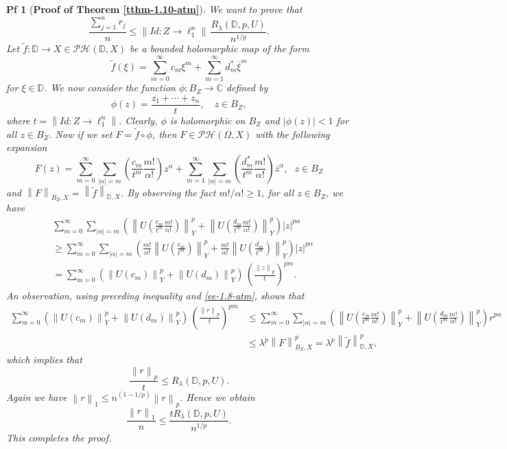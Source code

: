 \documentclass[10pt,a4paper]{amsart}
\newtheorem{pf}{Pf}
\newcommand{\norm}[1]{\left\lVert#1\right\rVert}
\begin{document}
\begin{pf} [{\bf Proof of Theorem \ref{tthm-1.10-atm}}]
	We want to prove that 
	\begin{equation*}
		\frac{\sum_{j=1}^{n}r_j}{n}\leq \norm{Id: Z \rightarrow \ell^n_{1}}\, \frac{R_\lambda(\mathbb{D},p,U)}{n^{1/p}}.
	\end{equation*}
	Let $\tilde{f}:\mathbb{D}\rightarrow X \in \mathcal{PH}(\mathbb{D},X)$ be a bounded holomorphic map of the form $$\tilde{f}(\xi)=\sum_{m=0}^{\infty} c_{m} \xi^m + \sum_{m=1}^{\infty} d^{*}_m \overline{\xi}^m
	$$
	 for $\xi \in \mathbb{D}$. We now consider the function $\phi: B_{Z}\rightarrow \mathbb{C}$ defined by 
	\begin{equation} \label{e-function}
		\phi(z)=\frac{z_1+\cdots+z_n}{t},\quad z\in B_{Z},
	\end{equation}
	where $t= \norm{Id: Z \rightarrow \ell^n_{1}}$. Clearly, $\phi$ is holomorphic on $B_{Z}$ and $|\phi(z)|<1$ for all $z \in B_{Z}$.
	Now if we set $F=\tilde{f} \circ \phi $, then $F \in \mathcal{PH}(\Omega,X)$ with the following expansion 
	\begin{equation*}
		F(z)=\sum_{m=0}^{\infty} \sum_{|\alpha|=m} \left(\frac{c_{m}}{t^m} \frac{m!}{\alpha!}\right) z^{\alpha} +  \sum_{m=1}^{\infty} \sum_{|\alpha|=m} \left(\frac{d^{*}_{m}}{t^m} \frac{m!}{\alpha!}\right) \overline{z}^{\alpha},\,\, \,\, z \in B_{Z}
	\end{equation*}
	and $\norm{F}_{B_{Z},X}=\norm{\tilde{f}}_{\mathbb{D},X}$.
	By observing the fact $m!/\alpha! \geq 1$, for all $z\in B_{Z}$, we have
	\begin{align*}
		&\sum_{m=0}^{\infty} \sum_{|\alpha|=m} \left(\norm{U\left(\frac{c_{m}}{t^m} \frac{m!}{\alpha!}\right)}^p_{Y} + \norm{U\left(\frac{d_{m}}{t^m} \frac{m!}{\alpha!}\right)}^p_{Y}\right)|z|^{p \alpha} \nonumber \\
		& \geq \sum_{m=0}^{\infty} \sum_{|\alpha|=m} \left(\frac{m!}{\alpha!}\norm{U\left(\frac{c_{m}}{t^m} \right)}^p_{Y} + \frac{m!}{\alpha!}\norm{U\left(\frac{d_{m}}{t^m} \right)}^p_{Y}\right)|z|^{p \alpha} \nonumber \\
		& = \sum_{m=0}^{\infty} (\norm{U(c_{m})}^p_{Y} + \norm{U(d_{m})}^p_{Y})\, \left(\frac{\norm{z}_{p}}{t}\right)^{p m}.
	\end{align*}
	An observation, using preceding inequality and \eqref{ee-1.8-atm}, shows that
	\begin{align*}
		\sum_{m=0}^{\infty} (\norm{U(c_{m})}^p_{Y} + \norm{U(d_{m})}^p_{Y})\, \left(\frac{\norm{r}_{p}}{t}\right)^{p m}
		&\leq \sum_{m=0}^{\infty} \sum_{|\alpha|=m} \left(\norm{U\left(\frac{c_{m}}{t^m} \frac{m!}{\alpha!}\right)}^p_{Y} + \norm{U\left(\frac{d_{m}}{t^m} \frac{m!}{\alpha!}\right)}^p_{Y}\right)r^{p \alpha} \nonumber \\
		&\leq \lambda^p  \norm{F}^p_{B_{Z},X}=\lambda^p \norm{\tilde{f}}^p_{\mathbb{D},X},
	\end{align*}
	which implies that 
	$$
	\frac{\norm{r}_{p}}{t} \leq R_\lambda(\mathbb{D},p,U).
	$$ Again we have $\norm{r}_{1}\leq n^{(1-1/p)}\norm{r}_{p}$. Hence we obtain $$
	\frac{\norm{r}_{1}}{n}\leq \frac{t R_\lambda(\mathbb{D},p,U)}{n^{1/p}}.
	$$ 
	This completes the proof.
\end{pf}
\end{document}
